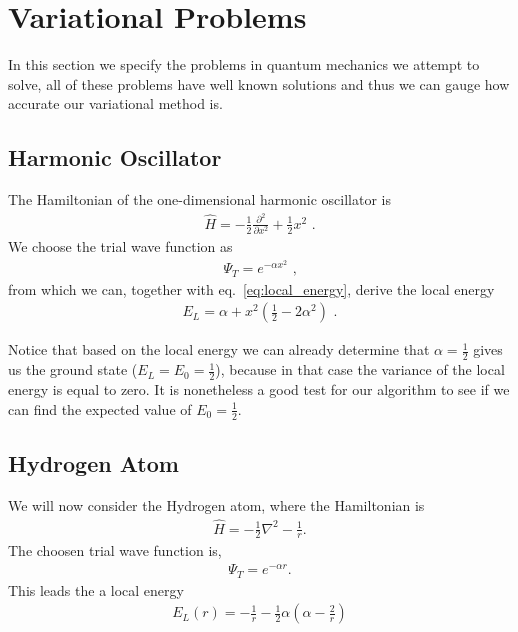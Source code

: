 \section{Variational Problems}
In this section we specify the problems in quantum mechanics we attempt to solve,
all of these problems have well known solutions and thus we can gauge how accurate our variational method is.

\subsection{Harmonic Oscillator}
The Hamiltonian of the one-dimensional harmonic oscillator is
\begin{align*}
  \hat{H} = -\frac{1}{2}\frac{\partial^2}{ \partial x^2} + \frac{1}{2} x^2 \text{~.}
\end{align*}
We choose the trial wave function as
  \begin{align*}
    \Psi_T = e^{-\alpha x^2} \text{~,}
  \end{align*}
from which we can, together with eq.~\eqref{eq:local_energy}, derive the local energy
  \begin{align*}
    E_L = \alpha + x^2 \left( \frac{1}{2} - 2\alpha^2 \right) \text{~.}
  \end{align*}

Notice that based on the local energy we can already determine
that $\alpha = \frac{1}{2}$ gives us the ground state ($E_L = E_0 = \frac{1}{2}$),
because in that case the variance of the local energy is equal to zero.
It is nonetheless a good test for our algorithm to see if we can find the expected
value of $E_0 = \frac{1}{2}$.



\subsection{Hydrogen Atom}
We will now consider the Hydrogen atom, where the Hamiltonian is
\begin{align*}
  \hat{H} = -\frac{1}{2}\nabla^2 - \frac{1}{r}.
\end{align*}
The choosen trial wave function is,
  \begin{align*}
    \Psi_T = e^{-\alpha r}.
  \end{align*}
This leads the a local energy
  \begin{align*}
    E_L(r) = - \frac{1}{r} - \frac{1}{2}\alpha  \left( \alpha - \frac{2}{r} \right)
  \end{align*}

